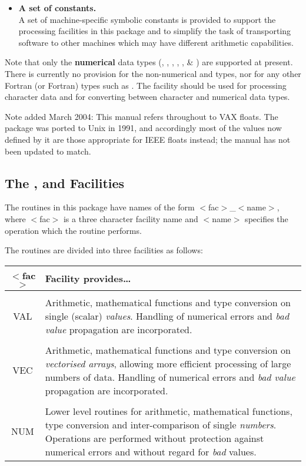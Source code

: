 \begin{itemize}
\item {\bf A set of constants.}\\
A set of machine-specific symbolic constants is provided to support the
processing facilities in this package and to simplify the task of
transporting software to other machines which may have different arithmetic
capabilities.

\end{itemize}

Note that only the {\bf numerical}  data types (,
, , , ,
 \& ) are supported at present.
There is currently no provision for the non-numerical  and
 types, nor for any other Fortran (or  Fortran) types
such as .
The  facility should be used for processing character data and for
converting between character and numerical data types.

Note added March 2004: This manual refers throughout to VAX floats.
The package was ported to Unix in 1991, and accordingly most of the
values now defined by it are those appropriate for IEEE floats
instead; the manual has not been updated to match.

\subsection{The ,  and  Facilities}

The routines in this package have names of the form
\mbox{$<$fac$>$\_$<$name$>$}, where \mbox{$<$fac$>$} is a three character
facility name and \mbox{$<$name$>$} specifies the operation which the
routine performs.

The routines are divided into three facilities as follows:

\begin{center}
\begin{tabular}{c|p{33em}}

{\bf $<$fac$>$} & {\bf Facility provides\ldots } \\
\hline
\\
VAL & Arithmetic, mathematical functions and type conversion on single
(scalar) {\em values}.
Handling of numerical errors and {\em bad value} propagation are
incorporated.\\
\\
VEC & Arithmetic, mathematical functions and type conversion on {\em
vectorised arrays}, allowing more efficient processing of large numbers of
data.
Handling of numerical errors and {\em bad value} propagation are
incorporated.\\
\\
NUM & Lower level routines for arithmetic, mathematical functions, type
conversion and inter-comparison of single {\em numbers}.
Operations are performed without protection against numerical errors and
without regard for {\em bad} values.
\\
\end{tabular}
\end{center}

